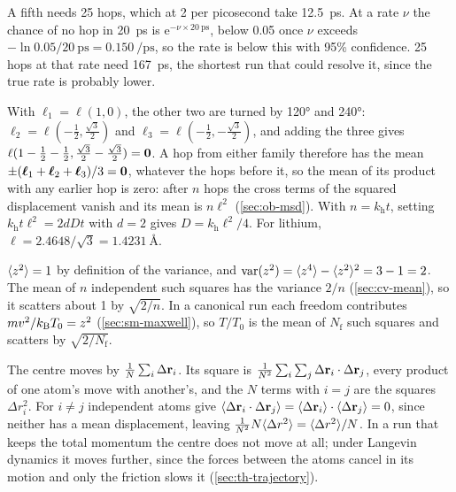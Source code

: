 A fifth needs 25 hops, which at 2 per picosecond
take \SI{12.5}{\pico\second}. At a rate $\nu$ the chance of no hop in
\SI{20}{\pico\second} is $\mathrm{e}^{-\nu\times\SI{20}{\pico\second}}$,
below 0.05 once $\nu$ exceeds $-\ln0.05/\SI{20}{\pico\second} =
\SI{0.150}{\per\pico\second}$, so the rate is below this with 95\%
confidence. 25 hops at that rate need \SI{167}{\pico\second}, the
shortest run that could resolve it, since the true rate is probably
lower.

With $\boldsymbol{\ell}_1 = \ell(1, 0)$, the
other two are turned by \ang{120} and \ang{240}: $\boldsymbol{\ell}_2 =
\ell(-\frac12, \frac{\sqrt3}{2})$ and $\boldsymbol{\ell}_3 =
\ell(-\frac12, -\frac{\sqrt3}{2})$, and adding the three gives $\ell(1 -
\frac12 - \frac12, \frac{\sqrt3}{2} - \frac{\sqrt3}{2}) = \bm{\mathrm{0}}$. A hop
from either family therefore has the mean $\pm(\boldsymbol{\ell}_1 +
\boldsymbol{\ell}_2 + \boldsymbol{\ell}_3)/3 = \bm{\mathrm{0}}$, whatever the hops
before it, so the mean of its product with any earlier hop is zero: after
$n$ hops the cross terms of the squared displacement vanish and its mean
is $n\ell^2$ (\cref{sec:ob-msd}). With $n = k_{\mathrm h}t$, setting
$k_{\mathrm h}t\ell^2 = 2dDt$ with $d = 2$ gives $D = k_{\mathrm
h}\ell^2/4$. For lithium, $\ell = 2.4648/\sqrt3 = \SI{1.4231}{\angstrom}$.

$\langle z^2 \rangle = 1$ by definition of the variance, and
$\operatorname{var}(z^2) = \langle z^4 \rangle - \langle z^2 \rangle^2 = 3 - 1 = 2$. The mean of
$n$ independent such squares has the variance $2/n$ (\cref{sec:cv-mean}),
so it scatters about 1 by $\sqrt{2/n}$. In a canonical run each freedom
contributes $mv^2/k_{\mathrm{B}} T_0 = z^2$ (\cref{sec:sm-maxwell}), so $T/T_0$ is
the mean of $N_{\mathrm f}$ such squares and scatters by
$\sqrt{2/N_{\mathrm f}}$.

The centre moves by $\frac1N\sum_i\Delta\bm{\mathrm{r}}_i$.
Its square is $\frac{1}{N^2}\sum_i\sum_j\Delta\bm{\mathrm{r}}_i\cdot\Delta\bm{\mathrm{r}}_j$,
every product of one atom's move with another's, and the $N$ terms with
$i = j$ are the squares $\Delta r_i^2$. For $i \ne j$ independent atoms
give $\langle \Delta\bm{\mathrm{r}}_i\cdot\Delta\bm{\mathrm{r}}_j \rangle = \langle \Delta\bm{\mathrm{r}}_i \rangle\cdot
\langle \Delta\bm{\mathrm{r}}_j \rangle = 0$, since neither has a mean displacement, leaving
$\frac{1}{N^2}N\langle \Delta r^2 \rangle = \langle \Delta r^2 \rangle/N$. In a run that
keeps the total momentum the centre does not move at all; under Langevin
dynamics it moves further, since the forces between the atoms cancel in
its motion and only the friction slows it (\cref{sec:th-trajectory}).


